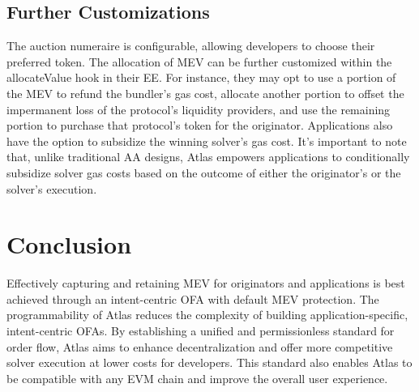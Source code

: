 \documentclass{article}
\begin{document}
\subsection{Further Customizations}
The auction numeraire is configurable, allowing developers to choose their preferred token. The allocation of MEV can be further customized within the allocateValue hook in their EE. For instance, they may opt to use a portion of the MEV to refund the bundler's gas cost, allocate another portion to offset the impermanent loss of the protocol's liquidity providers, and use the remaining portion to purchase that protocol's token for the originator. Applications also have the option to subsidize the winning solver’s gas cost. It's important to note that, unlike traditional AA designs, Atlas empowers applications to conditionally subsidize solver gas costs based on the outcome of either the originator’s or the solver’s execution. 

\section{Conclusion}
Effectively capturing and retaining MEV for originators and applications is best achieved through an intent-centric OFA with default MEV protection. The programmability of Atlas reduces the complexity of building application-specific, intent-centric OFAs. By establishing a unified and permissionless standard for order flow, Atlas aims to enhance decentralization and offer more competitive solver execution at lower costs for developers. This standard also enables Atlas to be compatible with any EVM chain and improve the overall user experience.



\end{document}
